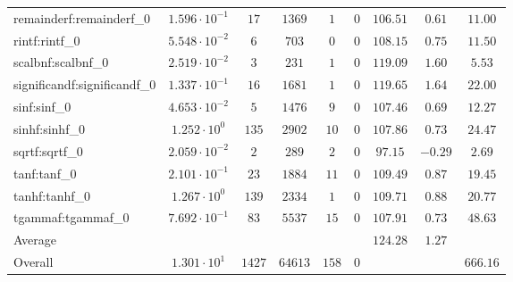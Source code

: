 \begin{tabular}{|l|c|c|c|c|c|c|c|c|}
remainderf:remainderf\_0     & $ 1.596 \cdot 10^{-1} $ & $ 17     $ & $ 1369  $ & $ 1   $ & $ 0   $ & $ 106.51      $ & $ 0.61    $ & $ 11.00   $ \\
rintf:rintf\_0               & $ 5.548 \cdot 10^{-2} $ & $ 6      $ & $ 703   $ & $ 0   $ & $ 0   $ & $ 108.15      $ & $ 0.75    $ & $ 11.50   $ \\
scalbnf:scalbnf\_0           & $ 2.519 \cdot 10^{-2} $ & $ 3      $ & $ 231   $ & $ 1   $ & $ 0   $ & $ 119.09      $ & $ 1.60    $ & $ 5.53    $ \\
significandf:significandf\_0 & $ 1.337 \cdot 10^{-1} $ & $ 16     $ & $ 1681  $ & $ 1   $ & $ 0   $ & $ 119.65      $ & $ 1.64    $ & $ 22.00   $ \\
sinf:sinf\_0                 & $ 4.653 \cdot 10^{-2} $ & $ 5      $ & $ 1476  $ & $ 9   $ & $ 0   $ & $ 107.46      $ & $ 0.69    $ & $ 12.27   $ \\
sinhf:sinhf\_0               & $ 1.252 \cdot 10^{0}  $ & $ 135    $ & $ 2902  $ & $ 10  $ & $ 0   $ & $ 107.86      $ & $ 0.73    $ & $ 24.47   $ \\
sqrtf:sqrtf\_0               & $ 2.059 \cdot 10^{-2} $ & $ 2      $ & $ 289   $ & $ 2   $ & $ 0   $ & $ 97.15       $ & $ -0.29   $ & $ 2.69    $ \\
tanf:tanf\_0                 & $ 2.101 \cdot 10^{-1} $ & $ 23     $ & $ 1884  $ & $ 11  $ & $ 0   $ & $ 109.49      $ & $ 0.87    $ & $ 19.45   $ \\
tanhf:tanhf\_0               & $ 1.267 \cdot 10^{0}  $ & $ 139    $ & $ 2334  $ & $ 1   $ & $ 0   $ & $ 109.71      $ & $ 0.88    $ & $ 20.77   $ \\
tgammaf:tgammaf\_0           & $ 7.692 \cdot 10^{-1} $ & $ 83     $ & $ 5537  $ & $ 15  $ & $ 0   $ & $ 107.91      $ & $ 0.73    $ & $ 48.63   $ \\
\hline
Average                      & $                     $ & $        $ & $       $ & $     $ & $     $ & $ 124.28      $ & $ 1.27    $ & $         $ \\
\hline
Overall                      & $ 1.301 \cdot 10^{1}  $ & $ 1427   $ & $ 64613 $ & $ 158 $ & $ 0   $ & $             $ & $         $ & $ 666.16  $ \\
\hline
\end{tabular}
